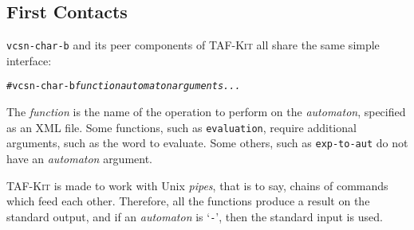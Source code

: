 \documentclass[a4paper]{report}
\newenvironment{shell}
{\begin{alltt}}
{\end{alltt}}
\newcommand\command[1]{\texttt{#1}}
\newcommand\var[1]{{\ttfamily\itshape #1}}
\newcommand\code[1]{\texttt{#1}}
\newcommand\samp[1]{`\texttt{#1}'}
\newcommand{\taffn}[1]{\code{#1}}
\newcommand{\tafkit}{\textsc{TAF-Kit}\xspace}
\begin{document}
\subsection{First Contacts}

\command{vcsn-char-b} and its peer components of \tafkit all share the same
simple interface:

\begin{shell}
# vcsn-char-b \var{function} \var{automaton} \var{arguments...}
\end{shell}

\noindent
The \var{function} is the name of the operation to perform on the
\var{automaton}, specified as an XML file.  Some functions, such as
\taffn{evaluation}, require additional arguments, such as the word to
evaluate.  Some others, such as \taffn{exp-to-aut} do not have an
\var{automaton} argument.

\tafkit is made to work with Unix \emph{pipes}, that is to say, chains
of commands which feed each other.  Therefore, all the functions
produce a result on the standard output, and if an \var{automaton} is
\samp{-}, then the standard input is used.

\smallskip
\end{document}
